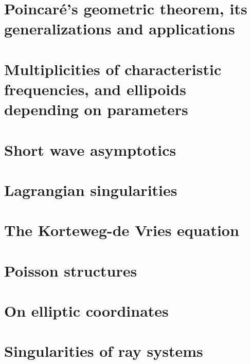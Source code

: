 \documentclass{book}
\numberwithin{equation}{section}
\theoremstyle{plain}
\theoremstyle{definition}
\theoremstyle{remark}
\theoremstyle{smallcap}
\numberwithin{prob}{section}
\begin{document}
\chapter{Poincar\'e's geometric theorem, its generalizations and
applications}

\chapter{Multiplicities of characteristic frequencies, and ellipoids
depending on parameters}

\chapter{Short wave asymptotics}

\chapter{Lagrangian singularities}

\chapter{The Korteweg-de Vries equation}

\chapter{Poisson structures}

\chapter{On elliptic coordinates}

\chapter{Singularities of ray systems}
\end{document}
